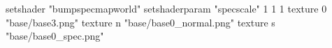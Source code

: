 setshader "bumpspecmapworld"
setshaderparam "specscale" 1 1 1
   texture 0 "base/base3.png"
   texture n "base/base0_normal.png"
   texture s "base/base0_spec.png"